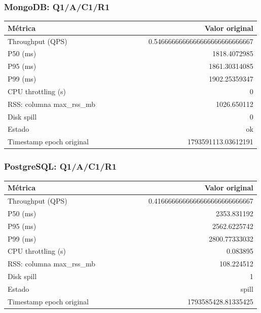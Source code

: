\subsubsection*{MongoDB: Q1/A/C1/R1}
\begin{longtable}{p{0.58\linewidth}r}
\toprule
Métrica & Valor original \\
\midrule\endhead
Throughput (QPS) & 0.\allowbreak{}5466666666666666666666666667 \\
P50 (ms) & 1818.\allowbreak{}4072985 \\
P95 (ms) & 1861.\allowbreak{}30314085 \\
P99 (ms) & 1902.\allowbreak{}25359347 \\
CPU throttling (s) & 0 \\
RSS: columna max\_\allowbreak{}rss\_\allowbreak{}mb & 1026.\allowbreak{}650112 \\
Disk spill & 0 \\
Estado & ok \\
Timestamp epoch original & 1793591113.\allowbreak{}03612191 \\
\bottomrule\end{longtable}
\subsubsection*{PostgreSQL: Q1/A/C1/R1}
\begin{longtable}{p{0.58\linewidth}r}
\toprule
Métrica & Valor original \\
\midrule\endhead
Throughput (QPS) & 0.\allowbreak{}4166666666666666666666666667 \\
P50 (ms) & 2353.\allowbreak{}831192 \\
P95 (ms) & 2562.\allowbreak{}6225742 \\
P99 (ms) & 2800.\allowbreak{}77333032 \\
CPU throttling (s) & 0.\allowbreak{}083895 \\
RSS: columna max\_\allowbreak{}rss\_\allowbreak{}mb & 108.\allowbreak{}224512 \\
Disk spill & 1 \\
Estado & spill \\
Timestamp epoch original & 1793585428.\allowbreak{}81335425 \\
\bottomrule\end{longtable}